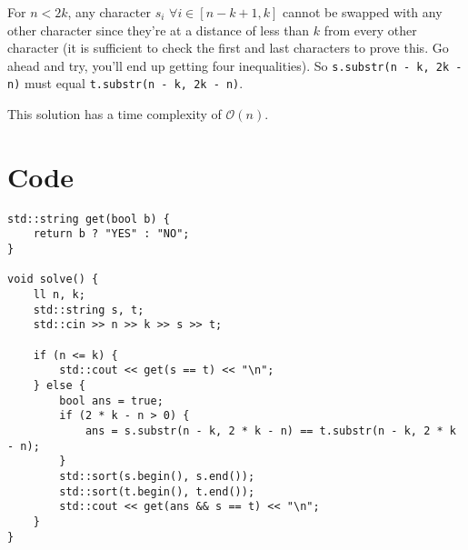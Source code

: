 \documentclass{article}
\begin{document}
For $n<2k$, any character $s_i$ $\forall i \in [n-k+1, k]$ cannot be swapped with any other character since they're at a distance of less than $k$ from every other character (it is sufficient to check the first and last characters to prove this. Go ahead and try, you'll end up getting four inequalities). So \texttt{s.substr(n - k, 2k - n)} must equal \texttt{t.substr(n - k, 2k - n)}.

This solution has a time complexity of $\mathcal{O}(n)$.
\section{Code}
\begin{verbatim}
std::string get(bool b) {
    return b ? "YES" : "NO";
}

void solve() {
    ll n, k;
    std::string s, t;
    std::cin >> n >> k >> s >> t;

    if (n <= k) {
        std::cout << get(s == t) << "\n";
    } else {
        bool ans = true;
        if (2 * k - n > 0) {
            ans = s.substr(n - k, 2 * k - n) == t.substr(n - k, 2 * k - n);
        }
        std::sort(s.begin(), s.end());
        std::sort(t.begin(), t.end());
        std::cout << get(ans && s == t) << "\n";
    }
}
\end{verbatim}
\end{document}
